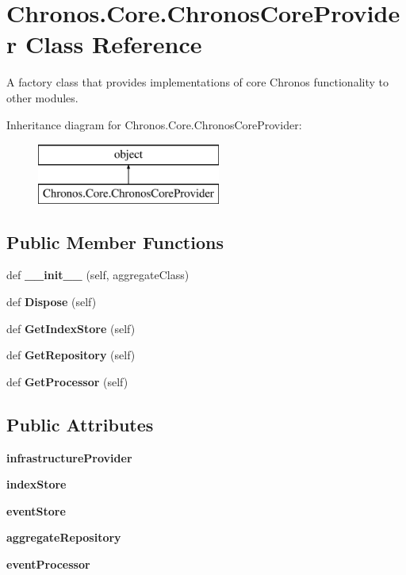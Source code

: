 \hypertarget{classChronos_1_1Core_1_1ChronosCoreProvider}{}\section{Chronos.\+Core.\+Chronos\+Core\+Provider Class Reference}
\label{classChronos_1_1Core_1_1ChronosCoreProvider}


A factory class that provides implementations of core Chronos functionality to other modules.  


Inheritance diagram for Chronos.\+Core.\+Chronos\+Core\+Provider\+:\begin{figure}[H]
\begin{center}
\leavevmode
\includegraphics[height=2.000000cm]{classChronos_1_1Core_1_1ChronosCoreProvider}
\end{center}
\end{figure}
\subsection*{Public Member Functions}
\begin{DoxyCompactItemize}
\item 
def {\bfseries \+\_\+\+\_\+init\+\_\+\+\_\+} (self, aggregate\+Class)
\item 
def {\bfseries Dispose} (self)
\item 
def {\bfseries Get\+Index\+Store} (self)
\item 
def {\bfseries Get\+Repository} (self)
\item 
def {\bfseries Get\+Processor} (self)
\end{DoxyCompactItemize}
\subsection*{Public Attributes}
\begin{DoxyCompactItemize}
\item 
{\bfseries infrastructure\+Provider}
\item 
{\bfseries index\+Store}
\item 
{\bfseries event\+Store}
\item 
{\bfseries aggregate\+Repository}
\item 
{\bfseries event\+Processor}
\end{DoxyCompactItemize}


